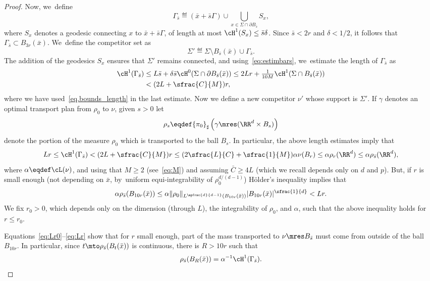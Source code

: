\begin{proof}
Now, we~define
\[
\Gamma_{\bar s} \eqdef (\bar x + \bar s \Gamma) \cup \bigcup_{x \in \Sigma \cap \partial B_{\bar s}} S_x,
\]
where $S_x$ denotes a geodesic connecting $x$ to $\bar x + \bar s \Gamma$, of
length at most $\cH^1(S_x)\le \bar s\delta$.
Since $\bar s<2r$ and $\delta<1/2$, it follows that $\Gamma_{\bar s} \subset B_{3r}(\bar x)$. We~define the competitor set as
\[
\Sigma' \eqdef \Sigma \setminus B_{\bar s}(\bar x) \cup \Gamma_{\bar s}.
\]
The addition of the geodesics $S_x$ ensures that $\Sigma'$ remains connected, and using~\eqref{eq:estimbars}, we~estimate the length of $\Gamma_{\bar s}$ as
\begin{equation}\label{eq:lengthGamma}
\begin{aligned}
\cH^1(\Gamma_{\bar s})
&\le L\bar s + \delta\bar s\cH^0(\Sigma\cap\partial B_{\bar s}(\bar x))
\le 2Lr + \tfrac{1}{10M}\cH^1(\Sigma\cap B_{\bar s}(\bar x))\\
&< (2L + \sfrac{C}{M})r,
\end{aligned}
\end{equation}
where we have used~\eqref{eq.bounds_length} in the last estimate.
Now we define a new competitor $\nu'$ whose support is $\Sigma'$. If $\gamma$ denotes an optimal transport plan from $\rho_0$ to $\nu$, given $s >0$ let
\[
\rho_{s} \eqdef {\pi_{0}}_\sharp\left(\gamma \mres(\RR^d\times B_{s})\right)
\]
denote the portion of the measure $\rho_0$ which is transported to the ball $B_{s}$. In particular, the above length estimates imply that
\begin{equation}\label{eq:Lr0}
Lr
\le
\cH^1(\Gamma_{\bar s})
<
(2L+\sfrac{C}{M})r
\le
(2\sfrac{L}{C}+\sfrac{1}{M})\alpha\nu(B_r)
\le
\alpha \rho_r(\RR^d)\leq \alpha \rho_{\bar s}(\RR^d),
\end{equation}
where $\alpha\eqdef\cL(\nu)$, and using that $M\ge 2$ (see~\eqref{eq:M}) and assuming $\bar C\ge 4L$ (which we recall depends
only on $d$ and $p$).
But, if $r$ is small enough (not depending on $\bar x$, by~uniform equi-integrability
of $\rho_0^{d/(d-1)}$) Hölder's inequality implies that
\begin{equation}\label{eq:Lr}
\alpha \rho_{\bar s}(B_{10r}(\bar x))
\le
\alpha\|\rho_0\|_{L^{\spfrac{d}{d-1}}(B_{10r}(\bar x))}
|B_{10r}(\bar x)|^{\sfrac{1}{d}} < Lr.
\end{equation}
We fix $r_0>0$, which depends only on the dimension (through $L$), the integrability of $\rho_0$, and $\alpha$, such that the above inequality holds for $r\le r_0$.

Equations~\eqref{eq:Lr0}--\eqref{eq:Lr} show that for $r$ small enough, part of the mass transported to $\nu \mres B_{\bar s}$ must come from outside of the ball $B_{10r}$. In particular, since $t \mto \rho_{\bar s}(B_t(\bar x))$ is continuous, there is $R > 10r$ such that
\begin{equation}\label{equation.mass_inNout_BR}
\rho_{\bar s}(B_R(\bar x)) = \alpha^{-1}\cH^1(\Gamma_{\bar s}).
\end{equation}


\end{proof}
